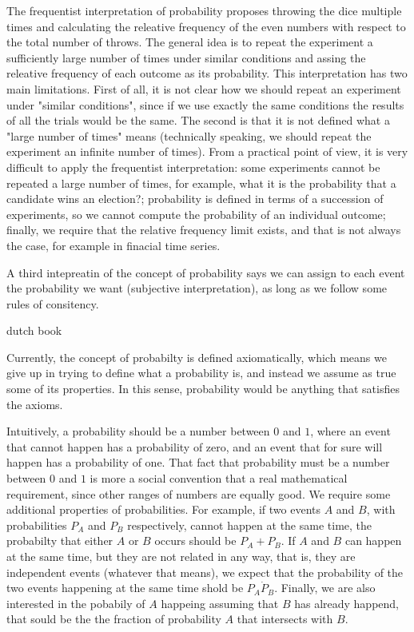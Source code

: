 The frequentist interpretation of probability proposes throwing the dice multiple times and calculating the releative frequency of the even numbers with respect to the total number of throws. The general idea is to repeat the experiment a sufficiently large number of times under similar conditions and assing the releative frequency of each outcome as its probability. This interpretation has two main limitations. First of all, it is not clear how we should repeat an experiment under "similar conditions", since if we use exactly the same conditions the results of all the trials would be the same. The second is that it is not defined what a "large number of times" means (technically speaking, we should repeat the experiment an infinite number of times). From a practical point of view, it is very difficult to apply the frequentist interpretation: some experiments cannot be repeated a large number of times, for example, what it is the probability that a candidate wins an election?; probability is defined in terms of a succession of experiments, so we cannot compute the probability of an individual outcome; finally, we require that the relative frequency limit exists, and that is not always the case, for example in finacial time series.

A third intepreatin of the concept of probability says we can assign to each event the probability we want (subjective interpretation), as long as we follow some rules of consitency.

dutch book

Currently, the concept of probabilty is defined axiomatically, which means we give up in trying to define what a probability is, and instead we assume as true some of its properties. In this sense, probability would be anything that satisfies the axioms.

Intuitively, a probability should be a number between $0$ and $1$, where an event that cannot happen has a probability of zero, and an event that for sure will happen has a probability of one. That fact that probability must be a number between $0$ and $1$ is more a social convention that a real mathematical requirement, since other ranges of numbers are equally good. We require some additional properties of probabilities. For example, if two events $A$ and $B$, with probabilities $P_A$ and $P_B$ respectively, cannot happen at the same time, the probabilty that either $A$ or $B$ occurs should be $P_A + P_B$. If $A$ and $B$ can happen at the same time, but they are not related in any way, that is, they are independent events (whatever that means), we expect that the probability of the two events happening at the same time shold be $P_A \dot P_B$. Finally, we are also interested in the pobabily of $A$ happeing assuming that $B$ has already happend, that sould be the the fraction of probability $A$ that intersects with $B$.

